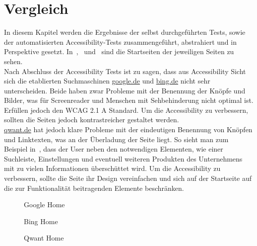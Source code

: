 \section{Vergleich}\label{sec:vergleich}
In diesem Kapitel werden die Ergebnisse der selbst durchgeführten Tests,
sowie der automatisierten Accessibility-Tests zusammengeführt, abstrahiert und in Perspektive gesetzt.
In~,~ und~ sind die Startseiten der jeweiligen Seiten zu sehen.\\

Nach Abschluss der Accessibility Tests ist zu sagen,
dass aus Accessibility Sicht sich die etablierten Suchmaschinen \url{google.de} und \url{bing.de} nicht sehr unterscheiden.
Beide haben zwar Probleme mit der Benennung der Knöpfe und Bilder, was für Screenreader und Menschen mit Sehbehinderung nicht optimal ist.
Erfüllen jedoch den WCAG 2.1 A Standard.
Um die Accessibility zu verbessern, sollten die Seiten jedoch kontrastreicher gestaltet werden.\\

\url{qwant.de} hat jedoch klare Probleme mit der eindeutigen Benennung von Knöpfen und Linktexten, was an der Überladung der Seite liegt.
So sieht man zum Beispiel in~, dass der User neben den notwendigen Elementen,
wie einer Suchleiste, Einstellungen und eventuell weiteren Produkten des Unternehmens mit zu vielen Informationen überschüttet wird.
Um die Accessibility zu verbessern, sollte die Seite ihr Design vereinfachen und sich auf der Startseite auf die zur Funktionalität beitragenden Elemente beschränken.


\begin{figure}[h]
    \centering
    \caption{Google Home}\label{fig:google_home}
\end{figure}
\begin{figure}[h]
    \centering
    \caption{Bing Home}\label{fig:bing_home}
\end{figure}
\begin{figure}[h]
    \centering
    \caption{Qwant Home}\label{fig:qwant_home}
\end{figure}